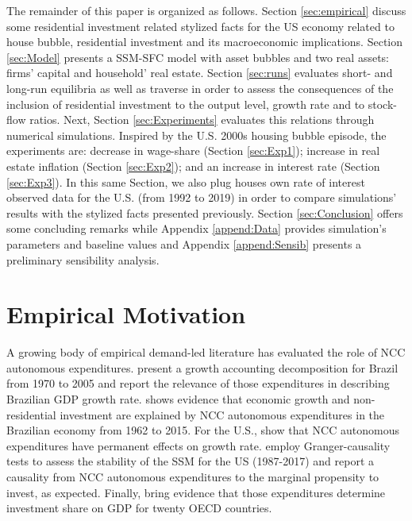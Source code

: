 \documentclass[11pt]{article}
\begin{document}
The remainder of this paper is organized as follows.
Section \ref{sec:empirical} discuss some residential investment related stylized facts for the US economy related to house bubble, residential investment and its macroeconomic implications.
Section \ref{sec:Model} presents a SSM-SFC model  with asset bubbles and two real assets: firms' capital and household' real estate. 
Section \ref{sec:runs} evaluates short- and long-run equilibria as well as traverse in order to assess the consequences  of the inclusion of residential investment to the output level, growth rate and to stock-flow ratios.
Next, Section \ref{sec:Experiments} evaluates this relations through numerical simulations.
Inspired by the U.S. 2000s housing bubble episode, the experiments are: decrease in wage-share (Section \ref{sec:Exp1}); increase in real estate inflation (Section \ref{sec:Exp2}); and an increase in interest rate (Section \ref{sec:Exp3}).
In this same Section, we also plug houses own rate of interest observed data for the U.S. (from 1992 to 2019) in order to compare simulations' results with the stylized facts presented previously.
Section \ref{sec:Conclusion} offers some concluding remarks while Appendix \ref{append:Data} provides simulation's parameters and baseline values and Appendix \ref{append:Sensib} presents a preliminary sensibility analysis.



\section{Empirical Motivation}
\label{sec:org5864198}
\label{sec:empirical}
A growing body of empirical demand-led literature has evaluated the role of NCC autonomous expenditures.
\textcite{freitas_pattern_2013} present a growth accounting decomposition for Brazil from 1970 to 2005 and report the relevance of those expenditures in describing Brazilian GDP growth rate.
\textcite{braga_investment_2020} shows evidence that economic growth and non-residential investment are explained by NCC autonomous expenditures in the Brazilian economy from 1962 to 2015.
For the U.S., \textcite{girardi_long-run_2016} show that NCC autonomous expenditures have permanent effects on growth rate.
\textcite{haluska_growth_2020} employ Granger-causality tests to assess the stability of the SSM for the US (1987-2017) and report a causality from NCC autonomous expenditures to the marginal propensity to invest, as expected.
Finally, \textcite{girardi_autonomous_2020} bring evidence that those expenditures determine investment share on GDP for twenty OECD countries.
\end{document}
